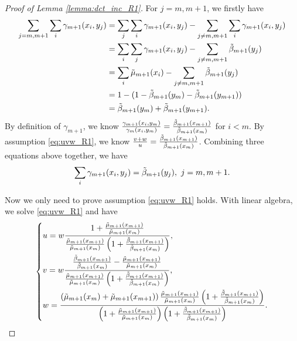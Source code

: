 \documentclass[nohyperref]{article}
\theoremstyle{plain}
\begin{document}
\begin{proof}[Proof of Lemma \ref{lemma:dct_inc_R1}]
For $j = m, m+1$, we firstly have
\begin{equation*}
    \begin{aligned}
        \sum_{j=m, m+1} \sum_i \gamma_{m+1} (x_i, y_j)
        &= \sum_{j} \sum_i \gamma_{m+1} (x_i, y_j) - \sum_{j \neq m, m+1} \sum_i \gamma_{m+1} (x_i, y_j) \\
        &=  \sum_{i} \sum_j \gamma_{m+1} (x_i, y_j) - \sum_{j \neq m, m+1} \Tilde{\beta}_{m+1}(y_j) \\
        &= \sum_{i} \Tilde{\mu}_{m+1}(x_i) - \sum_{j \neq m, m+1} \Tilde{\beta}_{m+1}(y_j) \\
        &= 1 - (1 - \Tilde{\beta}_{m+1}(y_m) - \Tilde{\beta}_{m+1}(y_{m+1})) \\
        &= \Tilde{\beta}_{m+1}(y_m) + \Tilde{\beta}_{m+1}(y_{m+1}). \\
    \end{aligned}
\end{equation*}
By definition of $\gamma_{m+1}$, we know $\frac{\gamma_{m+1} (x_i, y_m)}{\gamma_{m} (x_i, y_m)} = \frac{\Tilde{\beta}_{m+1} (x_{m+1})}{\Tilde{\beta}_{m+1} (x_m)}$ for $i < m$.
By assumption \eqref{eq:uvw_R1}, we know $\frac{v+w}{u} = \frac{\Tilde{\beta}_{m+1} (x_{m+1})}{\Tilde{\beta}_{m+1} (x_m)}$.
Combining three equations above together, we have
$$\sum_i \gamma_{m+1} (x_i, y_j) = \Tilde{\beta}_{m+1} (y_j), \ j = m, m+1.$$

Now we only need to prove assumption \eqref{eq:uvw_R1} holds.
With linear algebra, we solve \eqref{eq:uvw_R1} and have
\begin{equation*}
    \left\{
    \begin{aligned}
        &u = w \frac{1 + \frac{\Tilde{\mu}_{m+1} (x_{m+1})}{\Tilde{\mu}_{m+1} (x_m)}}{\frac{\Tilde{\mu}_{m+1} (x_{m+1})}{\Tilde{\mu}_{m+1} (x_m)} \left(1 + \frac{\Tilde{\beta}_{m+1} (x_{m+1})}{\Tilde{\beta}_{m+1} (x_m)}\right)}, \\
        &v = w \frac{\frac{\Tilde{\beta}_{m+1} (x_{m+1})}{\Tilde{\beta}_{m+1} (x_m)} - \frac{\Tilde{\mu}_{m+1} (x_{m+1})}{\Tilde{\mu}_{m+1} (x_m)}}{\frac{\Tilde{\mu}_{m+1} (x_{m+1})}{\Tilde{\mu}_{m+1} (x_m)} \left(1 + \frac{\Tilde{\beta}_{m+1} (x_{m+1})}{\Tilde{\beta}_{m+1} (x_m)}\right)}, \\
        &w = \frac{\left(\Tilde{\mu}_{m+1} (x_m) + \Tilde{\mu}_{m+1} (x_{m+1})\right)\frac{\Tilde{\mu}_{m+1} (x_{m+1})}{\Tilde{\mu}_{m+1} (x_m)} \left(1 + \frac{\Tilde{\beta}_{m+1} (x_{m+1})}{\Tilde{\beta}_{m+1} (x_m)}\right)}{\left(1 + \frac{\Tilde{\mu}_{m+1} (x_{m+1})}{\Tilde{\mu}_{m+1} (x_m)}\right) \left(1 + \frac{\Tilde{\beta}_{m+1} (x_{m+1})}{\Tilde{\beta}_{m+1} (x_m)}\right)}. \\
    \end{aligned}
    \right.
\end{equation*}


\end{proof}
\end{document}
